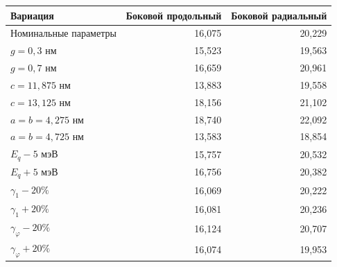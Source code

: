 \begin{tabular}{lrr}\toprule
Вариация & Боковой продольный & Боковой радиальный\\\midrule
Номинальные параметры & 16,075 & 20,229\\
$g=0{,}3$ нм & 15,523 & 19,563\\
$g=0{,}7$ нм & 16,659 & 20,961\\
$c=11{,}875$ нм & 13,883 & 19,558\\
$c=13{,}125$ нм & 18,156 & 21,102\\
$a=b=4{,}275$ нм & 18,740 & 22,092\\
$a=b=4{,}725$ нм & 13,583 & 18,854\\
$E_q-5$ мэВ & 15,757 & 20,532\\
$E_q+5$ мэВ & 16,756 & 20,382\\
$\gamma_1-20\%$ & 16,069 & 20,222\\
$\gamma_1+20\%$ & 16,081 & 20,236\\
$\gamma_\varphi-20\%$ & 16,124 & 20,707\\
$\gamma_\varphi+20\%$ & 16,074 & 19,953\\
\bottomrule\end{tabular}
